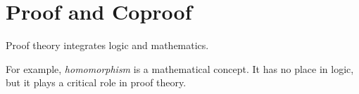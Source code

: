 \chapter{Proof and Coproof}

Proof theory integrates logic and mathematics.

For example, \textit{homomorphism} is a mathematical concept. It has
no place in logic, but it plays a critical role in proof theory.
